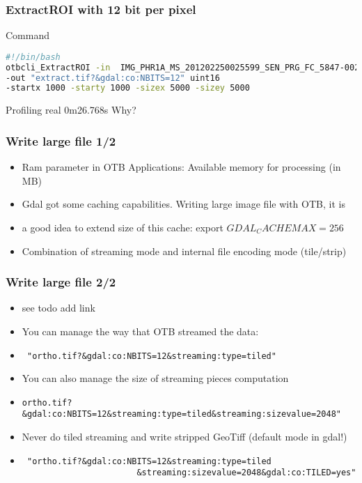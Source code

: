 \documentclass[8pt]{beamer}
\begin{document}
\begin{frame}[fragile]
\frametitle{ExtractROI with 12 bit per pixel}

\begin{block}{Command}
\begin{lstlisting}[language=bash]
#!/bin/bash
otbcli_ExtractROI -in  IMG_PHR1A_MS_201202250025599_SEN_PRG_FC_5847-002_R1C1.TIF 
-out "extract.tif?&gdal:co:NBITS=12" uint16 
-startx 1000 -starty 1000 -sizex 5000 -sizey 5000
\end{lstlisting}
\end{block}

\begin{block}{Profiling}
real	0m26.768s
Why?
\end{block}

\end{frame}

\begin{frame}[fragile]
\frametitle{Write large file 1/2}
\begin{itemize}
\item Ram parameter in OTB Applications: Available memory for processing (in MB)
\item Gdal got some caching capabilities. Writing large image file with OTB, it is
\item a good idea to extend size of this cache: export $GDAL_CACHEMAX=256$
\item Combination of streaming mode and internal file encoding  mode (tile/strip)
\end{itemize}
\end{frame}

\begin{frame}[fragile]
\frametitle{Write large file 2/2}
\begin{itemize}
\item see todo add link
\item You can manage the way that OTB streamed the data:
\item \begin{verbatim} "ortho.tif?&gdal:co:NBITS=12&streaming:type=tiled" \end{verbatim}
\item You can also manage the size of streaming pieces computation
\item \begin{verbatim}ortho.tif?&gdal:co:NBITS=12&streaming:type=tiled&streaming:sizevalue=2048" \end{verbatim} 
\item Never do tiled streaming and write stripped GeoTiff (default mode in gdal!)
\item \begin{verbatim} "ortho.tif?&gdal:co:NBITS=12&streaming:type=tiled
                       &streaming:sizevalue=2048&gdal:co:TILED=yes" \end{verbatim}
\end{itemize}
\end{frame}
\end{document}

